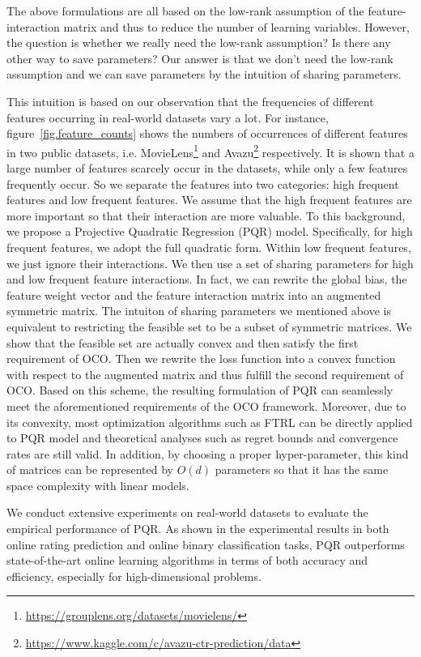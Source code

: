 \documentclass[letterpaper]{article} %
\theoremstyle{plain}
\theoremstyle{definition}
\begin{document}
The above formulations are all based on the low-rank assumption of the feature-interaction matrix and thus to reduce the number of learning variables. However, the question is whether we really need the low-rank assumption? Is there any other way to save parameters? Our answer is that we don't need the low-rank assumption and we can save parameters by the intuition of sharing parameters.

This intuition is based on our observation that the frequencies of different features occurring in real-world datasets vary a lot. For instance, figure~\ref{fig.feature_counts} shows the numbers of occurrences of different features in two public datasets, i.e. MovieLens\footnote{\url{https://grouplens.org/datasets/movielens/}} and Avazu\footnote{\url{https://www.kaggle.com/c/avazu-ctr-prediction/data}} respectively. It is shown that a large number of features scarcely occur in the datasets, while only a few features frequently occur. So we separate the features into two categories: high frequent features and low frequent features. We assume that the high frequent features are more important so that their interaction are more valuable. To this background, we propose a Projective Quadratic Regression (PQR) model. Specifically, for high frequent features, we adopt the full quadratic form. Within low frequent features, we just ignore their interactions. We then use a set of sharing parameters for high and low frequent feature interactions. In fact, we can rewrite the global bias, the feature weight vector and the feature interaction matrix into an augmented symmetric matrix. The intuiton of sharing parameters we mentioned above is equivalent to restricting the feasible set to be a subset of symmetric matrices. We show that the feasible set are actually convex and then satisfy the first requirement of OCO. Then we rewrite the loss function into a convex function with respect to the augmented matrix and thus fulfill the second requirement of OCO.  Based on this scheme, the resulting formulation of PQR can seamlessly meet the aforementioned requirements of the OCO framework. Moreover, due to its convexity, most optimization algorithms such as FTRL can be directly applied to PQR model and theoretical analyses such as regret bounds and convergence rates are still valid. In addition, by choosing a proper hyper-parameter, this kind of matrices can be represented by $O(d)$ parameters so that it has the same space complexity with linear models.

We conduct extensive experiments on real-world datasets to evaluate the empirical performance of PQR. As shown in the experimental results in both online rating prediction and online binary classification tasks, PQR outperforms state-of-the-art online learning algorithms in terms of both accuracy and efficiency, especially for high-dimensional problems.
\end{document}
